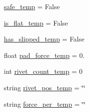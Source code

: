\begin{DoxyCompactItemize}
\item 
\hyperlink{namespaceimage__saver_af3438fe548c7a2a4bedc182241b561b8}{safe\-\_\-temp} = False
\item 
\hyperlink{namespaceimage__saver_a235654d217f0b0d68b2b6a2132c20444}{is\-\_\-flat\-\_\-temp} = False
\item 
\hyperlink{namespaceimage__saver_ab448c431265cb4d3554039b298caeebe}{has\-\_\-slipped\-\_\-temp} = False
\item 
float \hyperlink{namespaceimage__saver_a8d9c1724e706c13fdd73c0f5fff0f56c}{pad\-\_\-force\-\_\-temp} = 0.
\item 
int \hyperlink{namespaceimage__saver_a2363a245d16b2bf478a90624a086b5a1}{rivet\-\_\-count\-\_\-temp} = 0
\item 
string \hyperlink{namespaceimage__saver_a36b656fd28c479ece23d857e2baf902b}{rivet\-\_\-pos\-\_\-temp} = \char`\"{}\char`\"{}
\item 
string \hyperlink{namespaceimage__saver_ac378fa61996eaccb603dc0532cf3890d}{force\-\_\-per\-\_\-temp} = \char`\"{}\char`\"{}
\end{DoxyCompactItemize}


